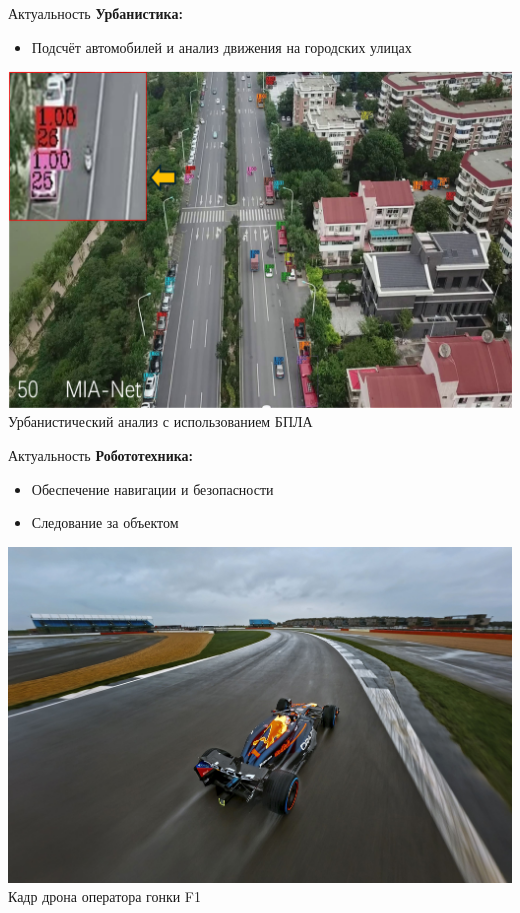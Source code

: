 \documentclass{beamer} %
\begin{document}
\begin{frame}{Актуальность}
  \textbf{Урбанистика:}
  \begin{itemize}
    \item Подсчёт автомобилей и анализ движения на городских улицах
  \end{itemize}
  \vspace{0.5cm}
  \centering
  \includegraphics[width=0.7\linewidth]{review/urban_uav.png}\\
  \small Урбанистический анализ с использованием БПЛА
\end{frame}

\begin{frame}{Актуальность}
  \textbf{Робототехника:}
  \begin{itemize}
    \item Обеспечение навигации и безопасности
    \item Следование за объектом
  \end{itemize}
  \vspace{0.5cm}
  \centering
  \includegraphics[width=0.7\linewidth]{presentation/f1_car.jpg}\\
  \small Кадр дрона оператора гонки F1
\end{frame}
\end{document}
